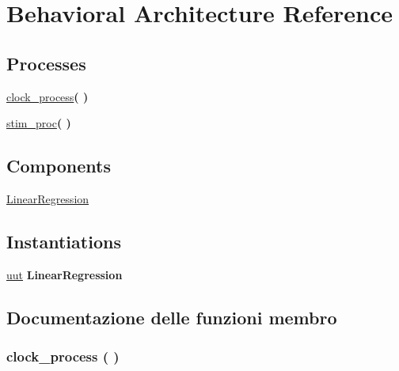\hypertarget{classtb___linear_regression_1_1_behavioral}{}\section{Behavioral Architecture Reference}
\label{classtb___linear_regression_1_1_behavioral}
\subsection*{Processes}
 \begin{DoxyCompactItemize}
\item 
\hyperlink{classtb___linear_regression_1_1_behavioral_ac0731c1f0a226305f2a590b4044cdccb}{clock\+\_\+process}{\bfseries  (  )}
\item 
\hyperlink{classtb___linear_regression_1_1_behavioral_ad2efa6785cff833c341e27596b21aeb5}{stim\+\_\+proc}{\bfseries  (  )}
\end{DoxyCompactItemize}
\subsection*{Components}
 \begin{DoxyCompactItemize}
\item 
\hyperlink{classtb___linear_regression_1_1_behavioral_a899499ba78b32b936cd0914831a72c95}{Linear\+Regression}  {\bfseries }  
\end{DoxyCompactItemize}
\subsection*{Instantiations}
 \begin{DoxyCompactItemize}
\item 
\hyperlink{classtb___linear_regression_1_1_behavioral_a1619316ad715601eb5d3559db829ac05}{uut}  {\bfseries Linear\+Regression}   
\end{DoxyCompactItemize}


\subsection{Documentazione delle funzioni membro}
\subsubsection[{\texorpdfstring{clock\+\_\+process}{clock_process}}]{\setlength{\rightskip}{0pt plus 5cm} {\bfseries \textcolor{vhdlchar}{ }} clock\+\_\+process ( ) \hspace{0.3cm}{\ttfamily [Process]}}\hypertarget{classtb___linear_regression_1_1_behavioral_ac0731c1f0a226305f2a590b4044cdccb}{}\label{classtb___linear_regression_1_1_behavioral_ac0731c1f0a226305f2a590b4044cdccb}

